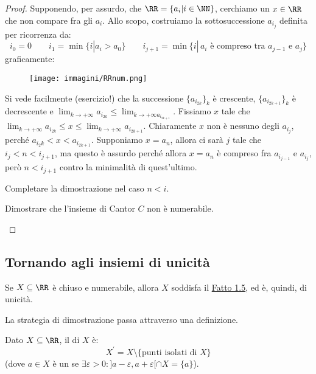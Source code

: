 \documentclass[11pt]{scrartcl}
\begin{document}
\begin{proof}
Supponendo, per assurdo, che $\RR = \{a_i | i \in \NN\}$, cerchiamo un $x \in \RR$ che non compare fra gli $a_i$. Allo scopo, costruiamo la sottosuccessione $a_{i_j}$
definita per ricorrenza da:
\[ i_0 = 0 \qquad i_1 = \min\{i | a_i > a_0\} \qquad i_{j+1} = \min\{i | \, \text{$a_i$ è compreso tra $a_{j-1}$ e $a_j$}\}
	\]
graficamente:

\begin{center}
	\begin{figure}[h]
		\centering
		\texttt{[image: immagini/RRnum.png]}
	\end{figure}
\end{center}

Si vede facilmente (esercizio!) che la successione $\{a_{i_{2k}}\}_k$ è crescente, $\{a_{i_{2k+1}}\}_k$ è decrescente 
e $\displaystyle \lim_{k \to +\infty} a_{i_{2k}} \leq \lim_{k \to +\infty a_{i_{2k+1}}}$. Fissiamo $x$ tale che $\displaystyle \lim_{k \to +\infty} a_{i_{2k}} \leq x \leq \lim_{k \to +\infty} a_{i_{2k+1}}$.
Chiaramente $x$ non è nessuno degli $a_{i_j}$, perché $a_{i_2k} < x < a_{i_{2k+1}}$. Supponiamo $x = a_n$, allora ci sarà $j$ tale che $i_j < n < i_{j+1}$, ma 
questo è assurdo perché allora $x = a_n$ è compreso fra $a_{i_{j-1}}$ e $a_{i_j}$, però $n < i_{j+1}$ contro la minimalità di quest'ultimo.

\begin{exercise}
Completare la dimostrazione nel caso $n < i$.
\end{exercise}

\begin{exercise}
Dimostrare che l'insieme di Cantor $C$ non è numerabile.
\end{exercise}
\end{proof}

\pagebreak
\subsection{Tornando agli insiemi di unicità}

\begin{theorem}
\label{CL}
Se $X \subseteq \RR$ è chiuso e numerabile, allora $X$ soddisfa il \hyperref[unicità]{Fatto 1.5}, ed è, quindi, di unicità.
\end{theorem}

La strategia di dimostrazione passa attraverso una definizione.

\begin{definition}
Dato $X \subseteq \RR$, il  di $X$ è:
\[ X^{\prime} = X \setminus\{\text{punti isolati di $X$}\}
	\]
(dove $a \in X$ è un  se $\exists \varepsilon > 0 : ]a - \varepsilon, a + \varepsilon[ \cap X = \{a\}$).
\end{definition}
\end{document}

